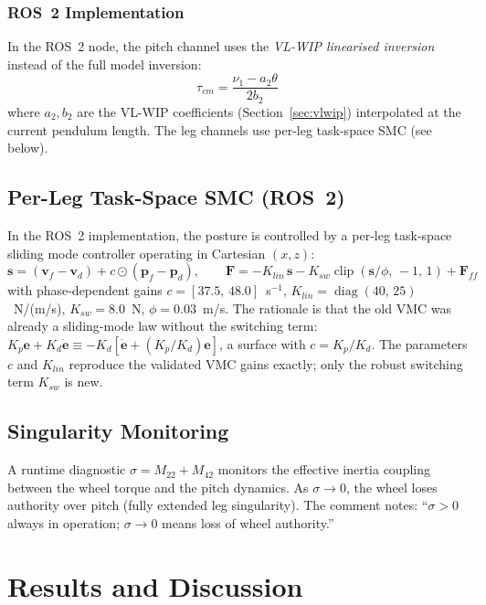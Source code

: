 \documentclass[11pt,a4paper]{article}
\begin{document}
\subsubsection{ROS~2 Implementation}

In the ROS~2 node, the pitch channel uses the \emph{VL-WIP linearised inversion} instead
of the full model inversion:
\begin{equation}
    \tau_{cm} = \frac{\nu_1 - a_2\theta}{2b_2}
\end{equation}
where $a_2, b_2$ are the VL-WIP coefficients (Section~\ref{sec:vlwip}) interpolated at
the current pendulum length.  The leg channels use per-leg task-space SMC (see below).

\subsection{Per-Leg Task-Space SMC (ROS~2)}

In the ROS~2 implementation, the posture is controlled by a per-leg task-space sliding mode
controller operating in Cartesian $(x,z)$:
\begin{equation}
    \bm{s} = (\bm{v}_f - \bm{v}_d) + c \odot (\bm{p}_f - \bm{p}_d), \qquad
    \bm{F} = -K_{lin}\,\bm{s} - K_{sw}\operatorname{clip}(\bm{s}/\phi,\,-1,\,1) +
    \bm{F}_{ff}
\end{equation}
with phase-dependent gains $c = [37.5,\,48.0]$~s$^{-1}$, $K_{lin} = \operatorname{diag}(40,\,25)$~N/(m/s),
$K_{sw} = 8.0$~N, $\phi = 0.03$~m/s.  The rationale is that the old VMC was already a
sliding-mode law without the switching term:
$K_p\bm{e} + K_d\dot{\bm{e}} \equiv -K_d[\dot{\bm{e}} + (K_p/K_d)\bm{e}]$, a surface
with $c = K_p/K_d$.  The parameters $c$ and $K_{lin}$ reproduce the validated VMC gains
exactly; only the robust switching term $K_{sw}$ is new.

\subsection{Singularity Monitoring}

A runtime diagnostic $\sigma = M_{22} + M_{42}$ monitors the effective inertia coupling
between the wheel torque and the pitch dynamics.  As $\sigma \to 0$, the wheel loses
authority over pitch (fully extended leg singularity).  The comment notes:
``$\sigma > 0$ always in operation; $\sigma \to 0$ means loss of wheel authority.''


\section{Results and Discussion}
\label{sec:results}
\end{document}
